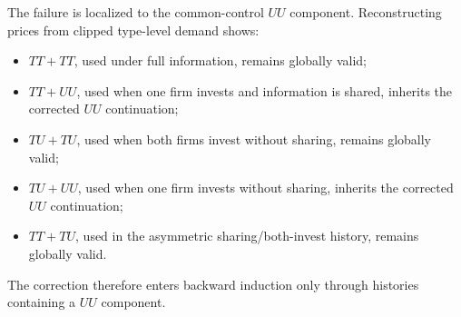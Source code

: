 The failure is localized to the common-control \(UU\) component.  Reconstructing prices from clipped type-level demand shows:
\begin{itemize}
\item \(TT+TT\), used under full information, remains globally valid;
\item \(TT+UU\), used when one firm invests and information is shared, inherits the corrected \(UU\) continuation;
\item \(TU+TU\), used when both firms invest without sharing, remains globally valid;
\item \(TU+UU\), used when one firm invests without sharing, inherits the corrected \(UU\) continuation;
\item \(TT+TU\), used in the asymmetric sharing/both-invest history, remains globally valid.
\end{itemize}
The correction therefore enters backward induction only through histories containing a \(UU\) component.
